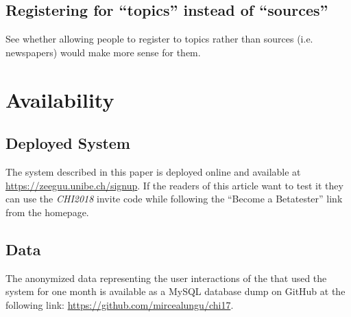\subsection{Registering for ``topics'' instead of ``sources''}
See whether allowing people to register to topics rather than sources (i.e. newspapers) would make more sense for them. 




\section{Availability}

\subsection{Deployed System}
The system described in this paper is deployed online and available at \url{https://zeeguu.unibe.ch/signup}. If the readers of this article want to test it they can use the {\em CHI2018} invite code while following the  ``Become a Betatester'' link from the homepage.

\subsection{Data}
The anonymized data representing the user interactions of the \students that used the system for one month is available as a MySQL database dump on GitHub at the following link: \url{https://github.com/mircealungu/chi17}.


